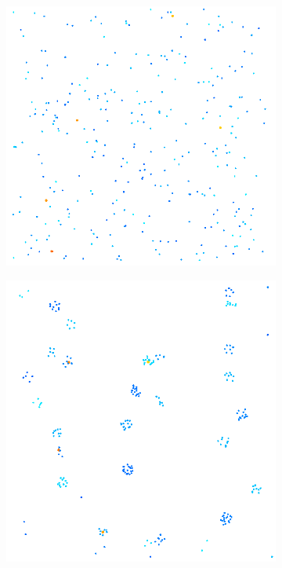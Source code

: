 \documentclass[12pt]{article}
\begin{document}
\begin{figure}[h]
    \centering
    \begin{subfigure}{0.4\textwidth}
        \includegraphics[width=\linewidth]{fig/old_1.png}
        \label{fig:old1}
    \end{subfigure}
    \begin{subfigure}{0.4\textwidth}
        \includegraphics[width=\linewidth]{fig/old2.png}

\end{subfigure}
\end{figure}
\end{document}
